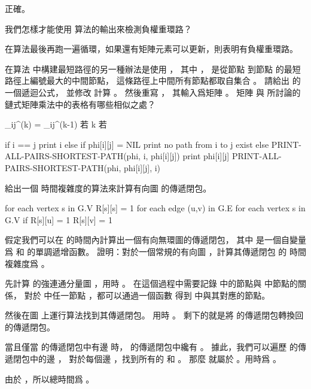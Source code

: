 \startANSWER
正確。
\stopANSWER

\startEXERCISE
我們怎樣才能使用  算法的輸出來檢測負權重環路？
\stopEXERCISE

\startANSWER
在算法最後再跑一遍循環，如果還有矩陣元素可以更新，則表明有負權重環路。
\stopANSWER

\startEXERCISE
在算法  中構建最短路徑的另一種辦法是使用 ，
其中 ，
  是從節點  到節點  的最短路徑上編號最大的中間節點，
這條路徑上中間所有節點都取自集合 。
請給出  的一個遞迴公式，
並修改  計算 。
然後重寫 ，
其輸入爲矩陣 。
矩陣 \m{\Phi} 與 所討論的鏈式矩陣乘法中的表格有哪些相似之處？
\stopEXERCISE

\startANSWER
\startformula
\phi_{ij}^{(k)} = \startcases
\NC \phi_{ij}^{(k-1)} \NC 若  \NR
\NC k \NC 若  \NR
\stopcases
\stopformula

\startCLRS
if i == j
	print i
else if phi[i][j] = NIL
	print no path from i to j exist
else
	PRINT-ALL-PAIRS-SHORTEST-PATH(phi, i, phi[i][j])
	print phi[i][j]
	PRINT-ALL-PAIRS-SHORTEST-PATH(phi, phi[i][j], i)
\stopCLRS
\stopANSWER

\startEXERCISE
給出一個  時間複雜度的算法來計算有向圖  的傳遞閉包。
\stopEXERCISE

\startANSWER
\startCLRS
for each vertex s in G.V
	R[s][s] = 1
for each edge (u,v) in G.E
	for each vertex s in G.V
		if R[s][u] = 1
			R[s][v] = 1
\stopCLRS
\stopANSWER

\startEXERCISE
假定我們可以在  的時間內計算出一個有向無環圖的傳遞閉包，
其中  是一個自變量爲  和  的單調遞增函數。
證明：對於一個常規的有向圖 ，計算其傳遞閉包  的
時間複雜度爲 。
\stopEXERCISE

\startANSWER
先計算  的強連通分量圖 ，用時 。
在這個過程中需要記錄  中的節點與  中節點的關係，
對於  中任一節點 ，都可以通過一個函數  得到  中與其對應的節點。

然後在圖  上運行算法找到其傳遞閉包。
用時 。
剩下的就是將  的傳遞閉包轉換回  的傳遞閉包。

當且僅當  的傳遞閉包中有邊  時，
  的傳遞閉包中纔有 。
據此，我們可以遍歷  的傳遞閉包中的邊 ，
對於每個邊 ，找到所有的  和 。
那麼  就屬於 。用時爲 。

由於 ，所以總時間爲 。
\stopANSWER

\stopsection

